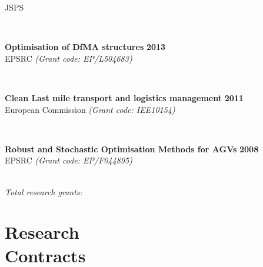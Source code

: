 \documentclass[margin]{res}
\newcommand\tab[1][1cm]{\hspace*{#1}}
\begin{document}
\begin{resume}
\begin{minipage}{\textwidth}
	\tab[0.2in] 
	\quad JSPS
	\end{minipage}
	\\
	\vspace{0.03in}
	\begin{minipage}{\textwidth}
	{\bf Optimisation of DfMA structures} \hfill {\bf 2013} \\
	\tab[0.2in] 
	\quad EPSRC
	\textit{(Grant code: EP/L504683)}
	\end{minipage}
	\\
	\vspace{0.03in}
	\begin{minipage}{\textwidth}
	{\bf Clean Last mile transport and logistics management} \hfill {\bf 2011} \\
	\tab[0.2in] 
	\quad European Commission
	\textit{(Grant code: IEE10154)}
	\end{minipage}
	\\
	\vspace{0.03in}
	\begin{minipage}{\textwidth}
	{\bf Robust and Stochastic Optimisation Methods for AGVs} \hfill {\bf 2008} \\
	\tab[0.2in] 
	\quad EPSRC
	\textit{(Grant code: EP/F044895)}
	\end{minipage}
	\\

\vspace{-0.25in}
\textit{Total research grants: }

\section{\sc Research\\ Contracts}


\end{resume}
\end{document}
